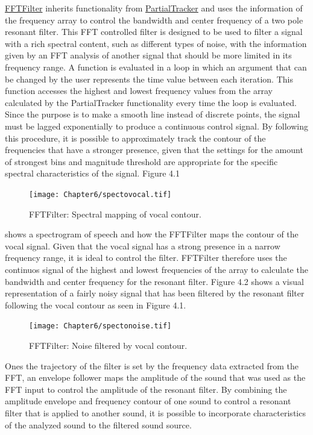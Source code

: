 \href{http://github.com/freuben/FedeLib/blob/master/PartialTracking/PartialTracker.sc}{FFTFilter} inherits functionality from \hyperlink{partrack}{PartialTracker} and uses the information of the frequency array to control the bandwidth and center frequency of a two pole resonant filter. This FFT controlled filter is designed to be used to filter a signal with a rich spectral content, such as different types of noise, with the information given by an FFT analysis of another signal that should be more limited in its frequency range. A function is evaluated in a loop in which an argument that can be changed by the user represents the time value between each iteration. This function accesses the highest and lowest frequency values from the array calculated by the PartialTracker functionality every time the loop is evaluated. Since the purpose is to make a smooth line instead of discrete points, the signal must be lagged exponentially to produce a continuous control signal. By following this procedure, it is possible to approximately track the contour of the frequencies that have a stronger presence, given that the settings for the amount of strongest bins and magnitude threshold are appropriate for the specific spectral characteristics of the signal. Figure 4.1 
\begin{figure}[htbp] %
   \centering
   \texttt{[image: Chapter6/spectovocal.tif]} %
   \caption{FFTFilter: Spectral mapping of vocal contour.}
   \label{fig:example}
\end{figure}
shows a spectrogram of speech and how the FFTFilter maps the contour of the vocal signal. Given that the vocal signal has a strong presence in a narrow frequency range, it is ideal to control the filter. FFTFilter therefore uses the continuos signal of the highest and lowest frequencies of the array to calculate the bandwidth and center frequency for the resonant filter. Figure 4.2 shows a visual representation of a fairly noisy signal that has been filtered by the resonant filter following the vocal contour as seen in Figure 4.1. 
\begin{figure}[htbp] %
   \centering
   \texttt{[image: Chapter6/spectonoise.tif]} %
   \caption{FFTFilter: Noise filtered by vocal contour.}
   \label{fig:example}
\end{figure}
Ones the trajectory of the filter is set by the frequency data extracted from the FFT, an envelope follower maps the amplitude of the sound that was used as the FFT input to control the amplitude of the resonant filter. By combining the amplitude envelope and frequency contour of one sound to control a resonant filter that is applied to another sound, it is possible to incorporate characteristics of the analyzed sound to the filtered sound source.

